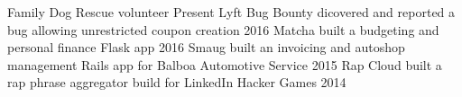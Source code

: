 \begin{cvhonors}
  \cvhonor
    {Family Dog Rescue}
    {volunteer}
    {}
    {Present}
  \cvhonor
    {Lyft Bug Bounty}
    {dicovered and reported a bug allowing unrestricted coupon creation}
    {}
    {2016}
  \cvhonor
    {Matcha}
    {built a budgeting and personal finance Flask app}
    {}
    {2016}
  \cvhonor
    {Smaug}
    {built an invoicing and autoshop management Rails app for Balboa Automotive Service}
    {}
    {2015}
  \cvhonor
    {Rap Cloud}
    {built a rap phrase aggregator build for LinkedIn Hacker Games}
    {}
    {2014}
\end{cvhonors}

